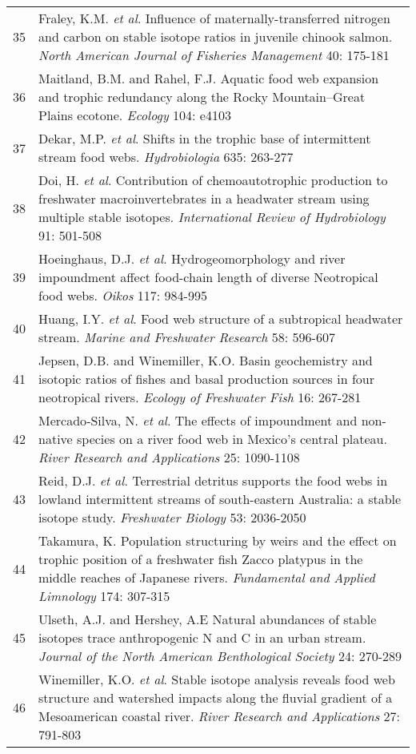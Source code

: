 \begin{longtable}{p{}p{}}
   35 & Fraley, K.M. \textit{et al}. Influence of maternally-transferred nitrogen and carbon on stable isotope ratios in juvenile chinook salmon. \textit{North American Journal of Fisheries Management} 40: 175-181 \\ 
   36 & Maitland, B.M. and Rahel, F.J. Aquatic food web expansion and trophic redundancy along the Rocky Mountain–Great Plains ecotone. \textit{Ecology} 104: e4103 \\ 
   37 & Dekar, M.P. \textit{et al}. Shifts in the trophic base of intermittent stream food webs. \textit{Hydrobiologia} 635: 263-277 \\ 
   38 & Doi, H. \textit{et al}. Contribution of chemoautotrophic production to freshwater macroinvertebrates in a headwater stream using multiple stable isotopes. \textit{International Review of Hydrobiology} 91: 501-508 \\ 
   39 & Hoeinghaus, D.J. \textit{et al}. Hydrogeomorphology and river impoundment affect food-chain length of diverse Neotropical food webs. \textit{Oikos} 117: 984-995 \\ 
   40 & Huang, I.Y. \textit{et al}. Food web structure of a subtropical headwater stream. \textit{Marine and Freshwater Research} 58: 596-607 \\ 
   41 & Jepsen, D.B. and Winemiller, K.O. Basin geochemistry and isotopic ratios of fishes and basal production sources in four neotropical rivers. \textit{Ecology of Freshwater Fish} 16: 267-281 \\ 
   42 & Mercado‐Silva, N. \textit{et al}. The effects of impoundment and non-native species on a river food web in Mexico's central plateau. \textit{River Research and Applications} 25: 1090-1108 \\ 
   43 & Reid, D.J. \textit{et al}. Terrestrial detritus supports the food webs in lowland intermittent streams of south-eastern Australia: a stable isotope study. \textit{Freshwater Biology} 53: 2036-2050 \\ 
   44 & Takamura, K. Population structuring by weirs and the effect on trophic position of a freshwater fish Zacco platypus in the middle reaches of Japanese rivers. \textit{Fundamental and Applied Limnology} 174: 307-315 \\ 
   45 & Ulseth, A.J. and Hershey, A.E Natural abundances of stable isotopes trace anthropogenic N and C in an urban stream. \textit{Journal of the North American Benthological Society} 24: 270-289 \\ 
   46 & Winemiller, K.O. \textit{et al}. Stable isotope analysis reveals food web structure and watershed impacts along the fluvial gradient of a Mesoamerican coastal river. \textit{River Research and Applications} 27: 791-803 \\ 
   \hline
\hline
\end{longtable}
\endgroup

